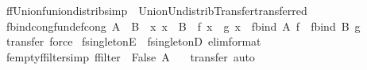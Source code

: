 \begin{isabellebody}
\isadelimdocument
%
\endisadelimdocument
%
\isatagdocument
%
\isamarkuptrue%
%
\isamarkuptrue%
%
\endisatagdocument
{\isafolddocument}%
%
\isadelimdocument
%
\endisadelimdocument
{}\isamarkupfalse%
\ ffUnion{\isacharunderscore}funion{\isacharunderscore}distrib{\isacharbrackleft}simp{\isacharbrackright}\ {\isacharequal}\ Union{\isacharunderscore}Un{\isacharunderscore}distrib{\isacharbrackleft}Transfer{\isachardot}transferred{\isacharbrackright}%
\isadelimdocument
%
\endisadelimdocument
%
\isatagdocument
%
\isamarkuptrue%
%
\endisatagdocument
{\isafolddocument}%
%
\isadelimdocument
%
\endisadelimdocument
{}\isamarkupfalse%
\ fbind{\isacharunderscore}cong{\isacharbrackleft}fundef{\isacharunderscore}cong{\isacharbrackright}{\isacharcolon}\ {\isachardoublequoteopen}A\ {\isacharequal}\ B\ {\isasymLongrightarrow}\ {\isacharparenleft}{\isasymAnd}x{\isachardot}\ x\ {\isacharbar}{\isasymin}{\isacharbar}\ B\ {\isasymLongrightarrow}\ f\ x\ {\isacharequal}\ g\ x{\isacharparenright}\ {\isasymLongrightarrow}\ fbind\ A\ f\ {\isacharequal}\ fbind\ B\ g{\isachardoublequoteclose}\isanewline
%
\isadelimproof
%
\endisadelimproof
%
\isatagproof
{}\isamarkupfalse%
\ transfer\ force%
\endisatagproof
{\isafoldproof}%
%
\isadelimproof
%
\endisadelimproof
%
\isadelimdocument
%
\endisadelimdocument
%
\isatagdocument
%
\isamarkuptrue%
%
\endisatagdocument
{\isafolddocument}%
%
\isadelimdocument
%
\endisadelimdocument
{}\isamarkupfalse%
\ fsingletonE\ {\isacharequal}\ fsingletonD\ {\isacharbrackleft}elim{\isacharunderscore}format{\isacharbrackright}%
\isadelimdocument
%
\endisadelimdocument
%
\isatagdocument
%
\isamarkuptrue%
%
\endisatagdocument
{\isafolddocument}%
%
\isadelimdocument
%
\endisadelimdocument
{}\isamarkupfalse%
\ fempty{\isacharunderscore}ffilter{\isacharbrackleft}simp{\isacharbrackright}{\isacharcolon}\ {\isachardoublequoteopen}ffilter\ {\isacharparenleft}{\isasymlambda}{\isacharunderscore}{\isachardot}\ False{\isacharparenright}\ A\ {\isacharequal}\ {\isacharbraceleft}{\isacharbar}{\isacharbar}{\isacharbraceright}{\isachardoublequoteclose}\isanewline
%
\isadelimproof
%
\endisadelimproof
%
\isatagproof
{}\isamarkupfalse%
\ transfer\ auto%
\endisatagproof
{\isafoldproof}%
%
\isadelimproof
\isanewline
%
\endisadelimproof
\isanewline
\isanewline
{}\isamarkupfalse%

\end{isabellebody}
